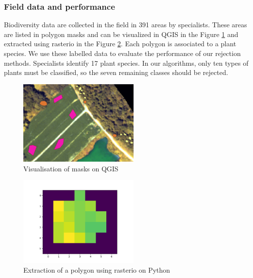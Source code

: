 \documentclass{siamart171218}
\begin{document}
\subsubsection{Field data and performance}

Biodiversity data are collected in the field in 391 areas by specialists. These areas are listed in polygon masks and can be visualized in QGIS in the Figure \ref{masks} and extracted using rasterio in the Figure \ref{polygon}. Each polygon is associated to a plant species. We use these labelled data to evaluate the performance of our rejection methods. Specialists identify 17 plant species. In our algorithms, only ten types of plants must be classified, so the seven remaining classes should be rejected. 

\begin{minipage}{0.44\textwidth}
\begin{figure}[H]
    \centering
    \includegraphics[width=6cm]{mask.PNG}
    \caption{Visualisation of masks on QGIS}
    \label{masks}
\end{figure}
\end{minipage}
\begin{minipage}{0.44\textwidth}
\begin{figure}[H]
    \centering
    \includegraphics[width=6cm]{polygone.png}
    \caption{Extraction of a polygon using rasterio on Python}
    \label{polygon}
\end{figure}
\end{minipage}
\end{document}
